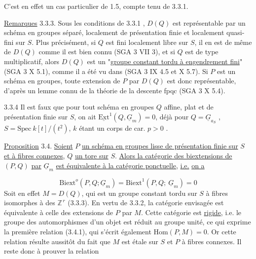 
C'est en effet un cas particulier de 1.5, compte tenu de 3.3.1.

\underline{Remarques} 3.3.3. Sous les conditions de 3.3.1 , $D(Q)$ est représentable par un schéma en groupes séparé, localement de présentation finie et localement quasi-fini sur $S$. Plus précisément, si $Q$ est fini localement libre sur $S$, il en est de même de $D(Q)$ comme il est bien connu (SGA 3 VII 3), et si $Q$ est de type multiplicatif, alors $D(Q)$ est un "\underline{groupe constant tordu à engendrement fini}" (SGA 3 X 5.1), comme il a été vu dans (SGA 3 IX 4.5 et X 5.7). Si $P$ est un schéma en groupes, toute extension de $P$ par $D(Q)$ est donc représentable, d'après un lemme connu de la théorie de la descente fpqc (SGA 3 X 5.4).

3.3.4 \qquad Il est faux \quad que pour tout schéma en groupes $Q$ affine, plat et de présentation finie sur $S$, on ait $\underline{\mathrm{Ext}}^1(Q,\underline{G}_m) = 0$, déjà pour $Q = \underline{G}_{a_S}$ , $S = \mathrm{Spec}\ k[t]/(t^2)$, $k$ étant un corps de car. $p > 0$ .

\underline{Proposition} 3.4. \underline{Soient} $P$ \underline{un schéma en groupes lisse de présentation finie sur} $S$ \underline{et à fibres connexes}, $Q$ \underline{un tore sur} $S$. \underline{Alors la catégorie des biextensions de} $(P,Q)$ \underline{par} $\underline{G}_m$ \underline{est équivalente à la catégorie ponctuelle}, \underline{i.e.} \underline{on a}

\begin{equation}\tag{3.4.1}
\mathrm{Biext}^{o}(P,Q;\underline{G}_m) = \mathrm{Biext}^1(P,Q;\ \underline{G}_m) = 0
\end{equation}
Soit en effet $M = D(Q)$, qui est un groupe constant tordu sur $S$ à fibres isomorphes à des $\mathbb{Z}^{\,r}$ (3.3.3). En vertu de 3.3.2, la catégorie envisagée est équivalente à celle des extensions de $P$ par $M$. Cette catégorie est \underline{rigide}, i.e. le groupe des automorphismes d'un objet
est réduit au groupe unité, ce qui exprime la première relation (3.4.1), qui s'écrit également $\mathrm{Hom}(P,M) = 0$. Or cette relation résulte aussitôt du fait que $M$ est étale sur $S$ et $P$ à fibres connexes. Il reste donc à prouver la relation

